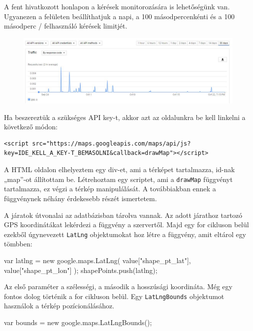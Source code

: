 A fent hivatkozott honlapon a kérések monitorozására is lehetőségünk van. Ugyanezen a felületen beállíthatjuk a napi, a 100 másodpercenkénti és a 100 másodperc / felhasználó kérések limitjét.

\begin{figure}[h!]
\centering
\includegraphics[scale=0.5]{kepek/google_maps_api_2.jpg}
\caption{}
\label{fig:google_maps_api_2}
\end{figure}

Ha beszereztük a szükséges API key-t, akkor azt az oldalunkra be kell linkelni a következő módon:

\begin{verbatim}
<script src="https://maps.googleapis.com/maps/api/js?
key=IDE_KELL_A_KEY-T_BEMASOLNI&callback=drawMap"></script>
\end{verbatim}

A HTML oldalon elhelyeztem egy div-et, ami a térképet tartalmazza, id-nak „map”-ot állítottam be. Létrehoztam egy scriptet, ami a \texttt{drawMap} függvényt tartalmazza, ez végzi a térkép manipulálását. A továbbiakban ennek a függvénynek néhány érdekesebb részét ismertetem.

A járatok útvonalai az adatbázisban tárolva vannak. Az adott járathoz tartozó GPS koordinátákat lekérdezi a függvény a szervertől. Majd egy for cikluson belül ezekből úgynevezett \texttt{LatLng} objektumokat hoz létre a függvény, amit eltárol egy tömbben:

\begin{cpp}
var latlng = new google.maps.LatLng(
    value["shape_pt_lat"],
    value["shape_pt_lon"]
);
shapePoints.push(latlng);
\end{cpp}

Az első paraméter a szélességi, a második a hosszúsági koordináta. Még egy fontos dolog történik a for cikluson belül. Egy \texttt{LatLngBounds} objektumot használok a térkép pozícionálásához.

\begin{cpp}
var bounds = new google.maps.LatLngBounds();
\end{cpp}

